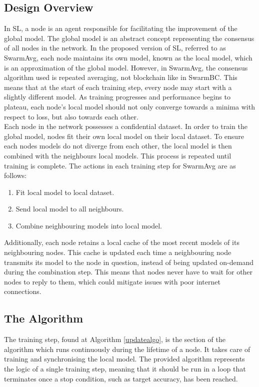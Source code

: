 \documentclass[letterpaper, 10 pt, conference]{ieeeconf}  %
\begin{document}
\subsection{Design Overview}
In SL, a node is an agent responsible for facilitating the improvement of the global model. The global model is an abstract concept representing the consensus of all nodes in the network. In the proposed version of SL, referred to as SwarmAvg, each node maintains its own model, known as the local model, which is an approximation of the global model. However, in SwarmAvg, the consensus algorithm used is repeated averaging, not blockchain like in SwarmBC. This means that at the start of each training step, every node may start with a slightly different model. As training progresses and performance begins to plateau, each node's local model should not only converge towards a minima with respect to loss, but also towards each other. \\

Each node in the network possesses a confidential dataset. In order to train the global model, nodes fit their own local model on their local dataset. To ensure each nodes models do not diverge from each other, the local model is then combined with the neighbours local models. This process is repeated until training is complete. The actions in each training step for SwarmAvg are as follows:
\begin{enumerate}
	\item Fit local model to local dataset.
	\item Send local model to all neighbours.
	\item Combine neighbouring models into local model.
\end{enumerate}

Additionally, each node retains a local cache of the most recent models of its neighbouring nodes. This cache is updated each time a neighbouring node transmits its model to the node in question, instead of being updated on-demand during the combination step. This means that nodes never have to wait for other nodes to reply to them, which could mitigate issues with poor internet connections.

\subsection{The Algorithm}
The training step, found at Algorithm \ref{updatealgo}, is the section of the algorithm which runs continuously during the lifetime of a node. It takes care of training and synchronising the local model. The provided algorithm represents the logic of a single training step, meaning that it should be run in a loop that terminates once a stop condition, such as target accuracy, has been reached.
\end{document}
